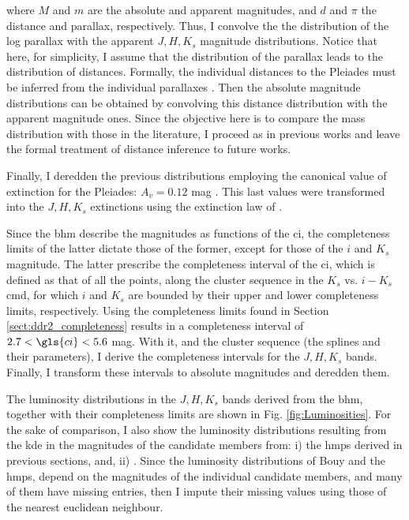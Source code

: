 where $M$ and $m$ are the absolute and apparent magnitudes, and $d$ and $\pi$ the distance and parallax, respectively. Thus, I convolve the the distribution of the log parallax with the apparent $J,H,K_s$ magnitude distributions. Notice that here, for simplicity, I assume that the distribution of the parallax leads to the distribution of distances. Formally, the individual distances to the Pleiades must be inferred from the individual parallaxes  \cite[see for example][]{2016ApJ...833..119A}. Then the absolute magnitude distributions can be obtained by convolving this distance distribution with the apparent magnitude ones. Since the objective here is to compare the mass distribution with those in the literature, I proceed as in previous works and leave the formal treatment of distance inference to future works.

Finally, I deredden the previous distributions employing the canonical value of extinction for the Pleiades: $A_v=0.12$ mag \citep{Guthrie1987}. This last values were transformed into the $J,H,K_s$ extinctions using the extinction law of \citet{Cardelli1989}.

Since the \gls{bhm} describe the magnitudes as functions of the \gls{ci}, the completeness limits of the latter dictate those of the former, except for those of the $i$ and $K_s$ magnitude. The latter prescribe the completeness interval of the \gls{ci}, which is defined as that of all the points, along the cluster sequence in the $K_s$ vs. $i-K_s$ \gls{cmd}, for which $i$ and $K_s$ are bounded by their upper and lower completeness limits, respectively. Using the completeness limits found in Section \ref{sect:ddr2_completeness} results in a completeness interval of  $2.7<\gls{ci}<5.6$ mag. With it, and the cluster sequence (the splines and their parameters), I derive the completeness intervals for the $J,H,K_s$ bands. Finally, I transform these intervals to absolute magnitudes and deredden them. 

The luminosity distributions in the $J,H,K_s$ bands derived from the \gls{bhm}, together with their completeness limits are shown in Fig. \ref{fig:Luminosities}. For the sake of comparison, I also show the luminosity distributions resulting from the \gls{kde} in the magnitudes of the candidate members from: i) the \gls{hmps} derived in previous sections, and, ii)  \citet{Bouy2015}. Since the  luminosity distributions of Bouy and the \gls{hmps}, depend on the magnitudes of the individual candidate members, and many of them have missing entries, then I impute their missing values using those of the nearest euclidean neighbour. 

